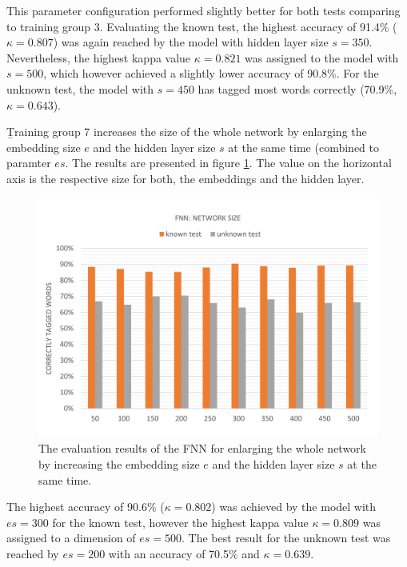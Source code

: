 This parameter configuration performed slightly better for both tests comparing to training group 3. Evaluating the known test, the highest accuracy of 91.4\% ($\kappa=0.807$) was again reached by the model with hidden layer size $s=350$. Nevertheless, the highest kappa value $\kappa=0.821$ was assigned to the model with $s=500$, which however achieved a slightly lower accuracy of 90.8\%. For the unknown test, the model with $s=450$ has tagged most words correctly (70.9\%, $\kappa=0.643$).

\b{Training group 7} increases the size of the whole network by enlarging the embedding size $e$ and the hidden layer size $s$ at the same time (combined to paramter $es$. The results are presented in figure \ref{f.evaluation.fnn.es}. The value on the horizontal axis is the respective size for both, the embeddings and the hidden layer.

\begin{figure}[H]
	\hspace{-5mm}\includegraphics[width=1.07\textwidth]{images/evaluation_fnn_es}
	\caption[FNN Evaluation: Network Size]{The evaluation results of the FNN for enlarging the whole network by increasing the embedding size $e$ and the hidden layer size $s$ at the same time.}
	\label{f.evaluation.fnn.es}
\end{figure}

The highest accuracy of 90.6\% ($\kappa=0.802$) was achieved by the model with $es=300$ for the known test, however the highest kappa value $\kappa=0.809$ was assigned to a dimension of $es=500$. The best result for the unknown test was reached by $es=200$ with an accuracy of 70.5\% and $\kappa=0.639$.

